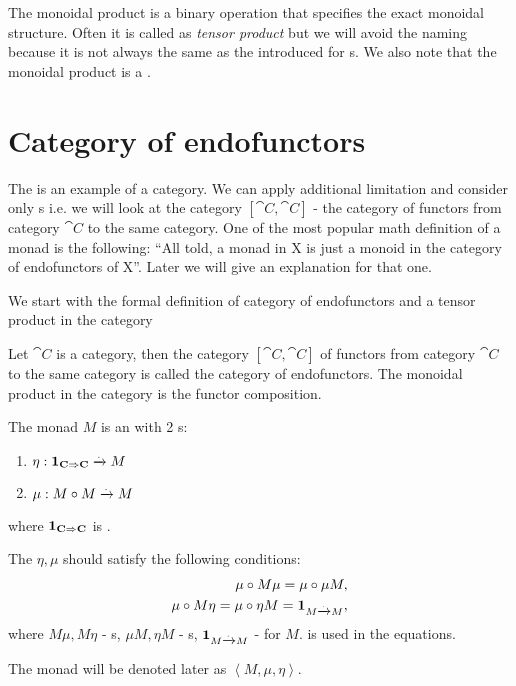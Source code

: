 \begin{remark}
\label{rem:monoidal_product}
The monoidal product is a binary operation that specifies the exact
monoidal structure. Often it is called as \textit{tensor product} but
we will avoid the naming because it is not always the same as the
 introduced for
s. We also note that the monoidal product is
a . 
\end{remark}

\section{Category of endofunctors}

The  is an example of a category. We can
apply additional limitation and consider only
s i.e. we will look at the category
$[\cat{C}, \cat{C}]$ - the category of functors from category $\cat{C}$ to
the same category. One of the most popular math definition of a monad
is the following: 
``All told, a monad in X is just a monoid in the category of
endofunctors of X''\cite{bib:maclane98}.
Later we will give an explanation for that one.

We start with the formal definition of category of endofunctors and a
tensor product in the category
\begin{definition}
\label{def:category_of_endofunctors}
Let $\cat{C}$ is a category, then  the category $[\cat{C}, \cat{C}]$ of
functors from category $\cat{C}$ to the same category is called the
category of endofunctors. The monoidal product in the category is the
functor composition. 
\end{definition}

\begin{definition}[Monad]
  \label{def:monad}
  The monad $M$ is an  with 2
  s:
  \begin{enumerate}
  \item $\eta: \mathbf{1}_{ \mathbf{C} \Rightarrow \mathbf{C} } \xrightarrow{.} M$
  \item $\mu: M \circ M \xrightarrow{.} M$
  \end{enumerate}
  where $\mathbf{1}_{ \mathbf{C} \Rightarrow \mathbf{C} }$ is .

  The $\eta, \mu$ should satisfy the following conditions:
  \begin{eqnarray}
    \mu \circ M \mu = \mu \circ \mu M, 
    \nonumber \\
    \mu \circ M \eta = \mu \circ \eta M = \mathbf{1}_{ M \xrightarrow{.} M },
    \label{eq:monad}
  \end{eqnarray}
  where $M \mu, M \eta$ - s, $\mu M, \eta M$ -
  s, $\mathbf{1}_{ M \xrightarrow{.} M }$ -  for $M$.
   is used in the equations.

  The monad will be denoted later as $\left<M, \mu, \eta\right>$.
\end{definition}

